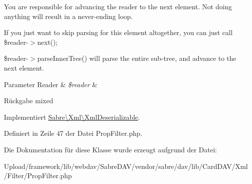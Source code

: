 You are responsible for advancing the reader to the next element. Not doing anything will result in a never-\/ending loop.

If you just want to skip parsing for this element altogether, you can just call \$reader-\/$>$next();

\$reader-\/$>$parse\+Inner\+Tree() will parse the entire sub-\/tree, and advance to the next element.


\begin{DoxyParams}[1]{Parameter}
Reader & {\em \$reader} & \\
\hline
\end{DoxyParams}
\begin{DoxyReturn}{Rückgabe}
mixed 
\end{DoxyReturn}


Implementiert \mbox{\hyperlink{interface_sabre_1_1_xml_1_1_xml_deserializable_a19e0eca545b9a0d93f7d6b69085ade30}{Sabre\textbackslash{}\+Xml\textbackslash{}\+Xml\+Deserializable}}.



Definiert in Zeile 47 der Datei Prop\+Filter.\+php.



Die Dokumentation für diese Klasse wurde erzeugt aufgrund der Datei\+:\begin{DoxyCompactItemize}
\item 
Upload/framework/lib/webdav/\+Sabre\+D\+A\+V/vendor/sabre/dav/lib/\+Card\+D\+A\+V/\+Xml/\+Filter/Prop\+Filter.\+php\end{DoxyCompactItemize}
